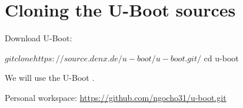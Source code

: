 
\section{Cloning the U-Boot sources}

Download U-Boot:

\begin{bashinput}
$ git clone https://source.denx.de/u-boot/u-boot.git/
$ cd u-boot
\end{bashinput}

We will use the U-Boot \workinguboot.


\begin{notebox}
Personal workspace: \url{https://github.com/ngocho31/u-boot.git}
\end{notebox}
